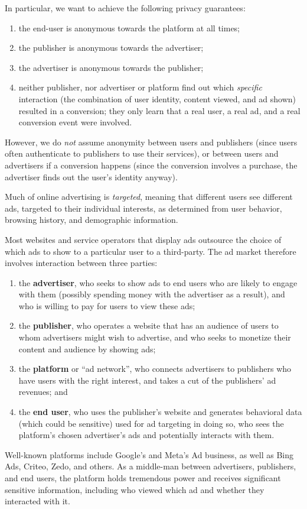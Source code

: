 %
In particular, we want to achieve the following privacy guarantees:
\begin{enumerate}[nosep]
  \item the end-user is anonymous towards the platform at all times;
  \item the publisher is anonymous towards the advertiser;
  \item the advertiser is anonymous towards the publisher;
  \item neither publisher, nor advertiser or platform find out which \emph{specific} interaction (the combination of user identity, content viewed, and ad shown)
	resulted in a conversion; they only learn that a real user, a real ad, and a real conversion event were involved.
\end{enumerate}
%
However, we do \emph{not} assume anonymity between users and publishers (since users often authenticate to publishers to use their services), or between users and advertisers if a conversion happens (since the conversion involves a purchase, the advertiser finds out the user's identity anyway).
%


Much of online advertising is \emph{targeted}, meaning that different users
see different ads, targeted to their individual interests, as determined
from user behavior, browsing history, and demographic information.
%

%
Most websites and service operators that display ads outsource the choice of
which ads to show to a particular user to a third-party.
%
The ad market therefore involves interaction between three parties:
\begin{enumerate}
 \item the \textbf{advertiser}, who seeks to show ads to end users who
   are likely to engage with them (possibly spending money with the
   advertiser as a result), and who is willing to pay for users to view
   these ads;
 \item the \textbf{publisher}, who operates a website that has an audience
   of users to whom advertisers might wish to advertise, and who seeks
   to monetize their content and audience by showing ads;
 \item the \textbf{platform} or ``ad network'', who connects advertisers
   to publishers who have users with the right interest, and takes a cut
   of the publishers' ad revenues; and
 \item the \textbf{end user}, who uses the publisher's website and generates
   behavioral data (which could be sensitive) used for ad targeting in doing so,
   who sees the platform's chosen advertiser's ads and potentially interacts
   with them.
\end{enumerate}
%
Well-known platforms include Google's and Meta's Ad business, as well
as Bing Ads, Criteo, Zedo, and others.
%
As a middle-man between advertisers, publishers, and end users, the platform
holds tremendous power and receives significant sensitive information, including
who viewed which ad and whether they interacted with it.
%

